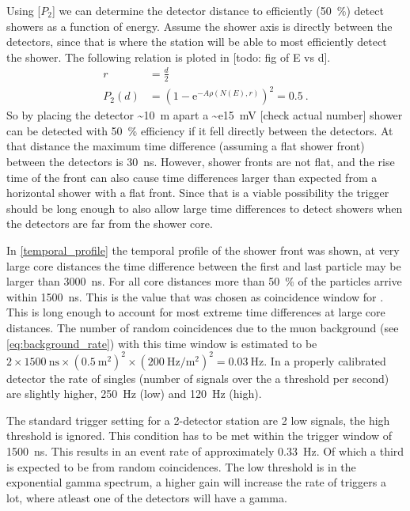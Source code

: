 Using [$P_2$] we can determine the detector distance to efficiently (\SI{50}{\percent}) detect showers as a function of energy. Assume the shower axis is directly between the detectors, since that is where the station will be able to most efficiently detect the shower. The following relation is ploted in [todo: fig of E vs d].
%
\begin{equation}
\begin{split}
    r &= \frac{d}{2} \\
    P_2(d) &= \left(1 - \mathrm{e}^{-A \rho(N(E), r)} \right)^2 = 0.5 \ .
\end{split}
\end{equation}
%
So by placing the detector \SI{~10}{\meter} apart a \SI{~e15}{\mV} [check actual number] shower can be detected with \SI{50}{\percent} efficiency if it fell directly between the detectors. At that distance the maximum time difference (assuming a flat shower front) between the detectors is \SI{30}{\ns}. However, shower fronts are not flat, and the rise time of the front can also cause time differences larger than expected from a horizontal shower with a flat front. Since that is a viable possibility the trigger should be long enough to also allow large time differences to detect showers when the detectors are far from the shower core.

In \cref{temporal_profile} the temporal profile of the shower front was shown, at very large core distances the time difference between the first and last particle may be larger than \SI{3000}{\ns}. For all core distances more than \SI{50}{\percent} of the particles arrive within \SI{1500}{\ns}. This is the value that was chosen as coincidence window for \hisparc. This is long enough to account for most extreme time differences at large core distances. The number of random coincidences due to the muon background (see \cref{eq:background_rate}) with this time window is estimated to be $2 \times \SI{1500}{\ns} \times \left(\SI{0.5}{\meter\squared}\right)^2 \times \left(\SI{200}{\hertz\per\meter\squared}\right)^2 = \SI{0.03}{\hertz}$. In a properly calibrated detector the rate of singles (number of signals over the a threshold per second) are slightly higher, \SI{250}{\hertz} (low) and \SI{120}{\hertz} (high).

The standard trigger setting for a 2-detector station are 2 low signals, the high threshold is ignored. This condition has to be met within the trigger window of \SI{1500}{\ns}. This results in an event rate of approximately \SI{0.33}{\hertz}. Of which a third is expected to be from random coincidences. The low threshold is in the exponential gamma spectrum, a higher \pmt gain will increase the rate of triggers a lot, where atleast one of the detectors will have a gamma.

